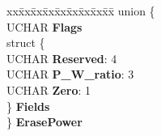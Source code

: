 \begin{DoxyCompactItemize}
\begin{tabbing}
\end{tabbing}\item 
\mbox{\label{struct___r_e_a_d___t_o_c___a_t_i_p_a5b165ed49d793f6ea4f38438d165263e}} 
\begin{tabbing}
xx\=xx\=xx\=xx\=xx\=xx\=xx\=xx\=xx\=\kill
union \{\\
\>UCHAR {\bfseries Flags}\\
\>struct \{\\
\>\>UCHAR {\bfseries Reserved}: 4\\
\>\>UCHAR {\bfseries P\_W\_ratio}: 3\\
\>\>UCHAR {\bfseries Zero}: 1\\
\>\} {\bfseries Fields}\\
\} {\bfseries ErasePower}\\


\end{tabbing}
\end{DoxyCompactItemize}
